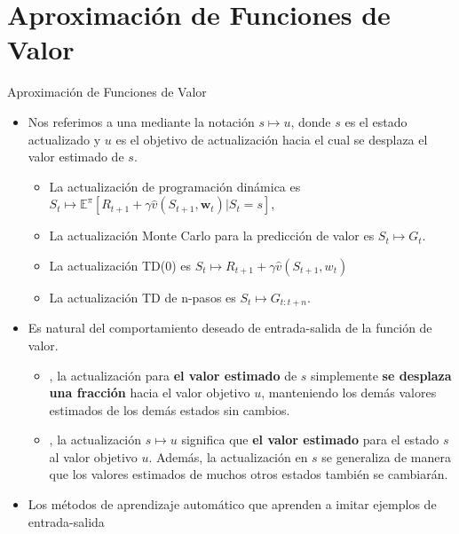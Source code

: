 \documentclass[10pt, envcountsect, handout, aspectratio=1610, hyperref={hypertexnames=true}]{beamer}
\begin{document}
\section{Aproximación de Funciones de Valor}
	
	
\begin{frame}{Aproximación de Funciones de Valor}
\begin{itemize}
    \item Nos referimos a una  mediante la notación $s \mapsto u$, donde $s$ es el estado actualizado y $u$ es el objetivo de actualización hacia el cual se desplaza el valor estimado de $s$.
    \begin{itemize}
    	\item La  actualización de programación dinámica es \( S_t \mapsto \mathbb{E}^\pi[R_{t+1} + \gamma \hat{v}(S_{t+1}, \mathbf{w}_t) | S_t = s] \),
        \item La actualización Monte Carlo para la predicción de valor es $S_t \mapsto G_t$.
        \item La actualización TD(0) es \( S_t \mapsto R_{t+1} + \gamma \hat{v}(S_{t+1}, w_t) \)
        \item La actualización TD de n-pasos es $S_t \mapsto G_{t:t+n}$.
    \end{itemize}
    \item Es natural  del comportamiento deseado de entrada-salida de la función de valor.
    \begin{itemize}
        \item {}, la actualización  para \textbf{el valor estimado} de \( s \) simplemente \textbf{se desplaza una fracción} hacia el valor objetivo \( u \), manteniendo los demás valores estimados de los demás estados sin cambios.
        
        \item {}, la actualización $s \mapsto u$ significa que \textbf{el valor estimado} para el estado $s$  al valor objetivo $u$. Además, la actualización en \( s \) se generaliza de manera que los valores estimados de muchos otros estados también se cambiarán.
    \end{itemize}
    
    \item {} Los métodos de aprendizaje automático que aprenden a imitar ejemplos de entrada-salida
    

\end{itemize}
\end{frame}
\end{document}

